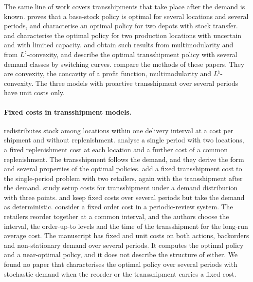 \documentclass[11pt]{article}
\theoremstyle{definition}
\begin{document}
The same line of work covers transshipments that take place after the demand is known. \citet{robinson1990optimal} proves that a base-stock policy is optimal for several locations and several periods, and \citet{archibald1997optimal} characterise an optimal policy for two depots with stock transfer. \citet{hu2008optimal} and \citet{yang2007capacitated} characterise the optimal policy for two production locations with uncertain and with limited capacity. \citet{li2014multimodularity} and \citet{chen2015new} obtain such results from multimodularity and from $L^{\natural}$-convexity, and \citet{van2019optimal} describe the optimal transshipment policy with several demand classes by switching curves. \citet{xu2023optimal} compare the methods of these papers. They are convexity, the concavity of a profit function, multimodularity and $L^{\natural}$-convexity. The three models with proactive transshipment over several periods have unit costs only.

\paragraph{Fixed costs in transshipment models.}
\citet{allen1961redistribution} redistributes stock among locations within one delivery interval at a cost per shipment and without replenishment. \citet{herer1999lateral} analyse a single period with two locations, a fixed replenishment cost at each location and a further cost of a common replenishment. The transshipment follows the demand, and they derive the form and several properties of the optimal policies. \citet{noham2014single} add a fixed transshipment cost to the single-period problem with two retailers, again with the transshipment after the demand. \citet{liang2014inventory} study setup costs for transshipment under a demand distribution with three points. \citet{herer2001dynamic} and \citet{herer2003optimal} keep fixed costs over several periods but take the demand as deterministic. \citet{zhou2023replenishment} consider a fixed order cost in a periodic-review system. The retailers reorder together at a common interval, and the authors choose the interval, the order-up-to levels and the time of the transshipment for the long-run average cost. The manuscript has fixed and unit costs on both actions, backorders and non-stationary demand over several periods. It computes the optimal policy and a near-optimal policy, and it does not describe the structure of either. We found no paper that characterises the optimal policy over several periods with stochastic demand when the reorder or the transshipment carries a fixed cost.
\end{document}
